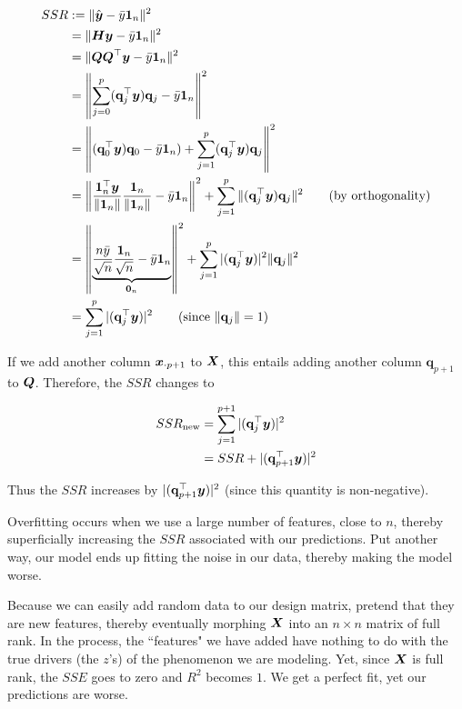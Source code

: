\documentclass[12pt]{article}
\begin{document}
\begin{enumerate}
\begin{align*}
	SSR &:= \|\yhat - \bar{y} \mathbf{1}_n\|^2\\
	&=\|\H\y-\bar{y}\mathbf{1}_n\|^2\\
	&=\|\Q \Q^\top\y-\bar{y}\mathbf{1}_n\|^2\\
	&=\left\|\sum_{j=0}^{p}(\mathbf{q}_j^\top \y)\mathbf{q}_j-\bar{y}\mathbf{1}_n\right\|^2\\
	&=\left\|(\mathbf{q}_0^\top \y)\mathbf{q}_0-\bar{y}\mathbf{1}_n)
	+\sum_{j=1}^{p}(\mathbf{q}_j^\top \y)\mathbf{q}_j\right\|^2\\
	&=\left\|\frac{\mathbf{1}_n^\top \y}{\|\mathbf{1}_n\|}\frac{\mathbf{1}_n}{\|\mathbf{1}_n\|}
	-\bar{y}\mathbf{1}_n\right\|^2
	+\sum_{j=1}^{p}\|(\mathbf{q}_j^\top \y)\mathbf{q}_j\|^2
	\tag{by orthogonality}\\
	&=\left\|\underbrace{\frac{n\bar{y}}{\sqrt{n}}\frac{\mathbf{1}_n}{\sqrt{n}}
	-\bar{y}\mathbf{1}_n}_{\mathbf{0}_n}\right\|^2
	+\sum_{j=1}^{p}|(\mathbf{q}_j^\top \y)|^2 \|\mathbf{q}_j\|^2\\
	&=\sum_{j=1}^{p}|(\mathbf{q}_j^\top \y)|^2
	\tag{since $\|\mathbf{q}_j\|=1$}
\end{align*}

If we add another column $\boldsymbol{x}_{\cdot p+1}$ to $\boldsymbol{X}$, this entails adding another column
$\mathbf{q}_{p+1}$ to $\boldsymbol{Q}$. Therefore, the $SSR$ changes to

\begin{align*}
	SSR_{\text{new}}
	&=\sum_{j=1}^{p+1}|(\mathbf{q}_j^\top \boldsymbol{y})|^2\\
	&=SSR+|(\mathbf{q}_{p+1}^\top \boldsymbol{y})|^2
\end{align*}

Thus the $SSR$ increases by $|(\mathbf{q}_{p+1}^\top \boldsymbol{y})|^2$ (since this quantity
is non-negative).


Overfitting occurs when we use a large number of features, close to $n$, thereby
superficially increasing the $SSR$ associated with our predictions. Put another
way, our model ends up fitting the noise in our data, thereby making the model worse.


Because we can easily add random data to our design matrix, pretend that they are new
features, thereby eventually morphing $\boldsymbol{X}$ into an $n\times n$ matrix of full rank.
In the process, the ``features" we have added have nothing to do with the true drivers
(the $z$'s) of the phenomenon we are modeling. Yet, since $\boldsymbol{X}$ is full rank, the
$SSE$ goes to zero and $R^2$ becomes $1$. We get a perfect fit, yet our predictions
are worse.


\end{enumerate}
\end{document}

